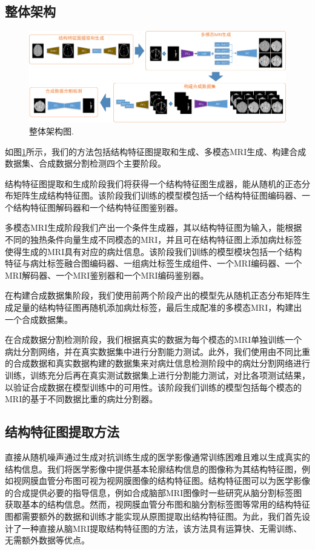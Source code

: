 \documentclass[letterpaper]{article} %
\begin{document}
\subsection{整体架构}
\begin{figure}
	\centering
	\includegraphics[width=0.98\linewidth]{figures/architecture}
	\caption{整体架构图.}
	\label{architecture}
\end{figure}
如图\ref{architecture}所示，我们的方法包括结构特征图提取和生成、多模态MRI生成、构建合成数据集、合成数据分割检测四个主要阶段。

结构特征图提取和生成阶段我们将获得一个结构特征图生成器，能从随机的正态分布矩阵生成结构特征图。该阶段我们训练的模型模包括一个结构特征图编码器、一个结构特征图解码器和一个结构特征图鉴别器。

多模态MRI生成阶段我们产出一个条件生成器，其以结构特征图为输入，能根据不同的独热条件向量生成不同模态的MRI，并且可在结构特征图上添加病灶标签使得生成的MRI具有对应的病灶信息。该阶段我们训练的模型模块包括一个结构特征与病灶标签融合图编码器、一组病灶标签生成组件、一个MRI编码器、一个MRI解码器、一个MRI鉴别器和一个MRI编码鉴别器。

在构建合成数据集阶段，我们使用前两个阶段产出的模型先从随机正态分布矩阵生成足量的结构特征图再随机添加病灶标签，最后生成配准的多模态MRI，构建出一个合成数据集。

在合成数据分割检测阶段，我们根据真实的数据为每个模态的MRI单独训练一个病灶分割网络，并在真实数据集中进行分割能力测试。此外，我们使用由不同比重的合成数据和真实数据构建的数据集来对病灶信息检测阶段中的病灶分割网络进行训练，训练充分后再在真实测试数据集上进行分割能力测试，对比各项测试结果，以验证合成数据在模型训练中的可用性。该阶段我们训练的模型包括每个模态的MRI的基于不同数据比重的病灶分割器。

\subsection{结构特征图提取方法}
直接从随机噪声通过生成对抗训练生成的医学影像通常训练困难且难以生成真实的结构信息。我们将医学影像中提供基本轮廓结构信息的图像称为其结构特征图，例如视网膜血管分布图可视为视网膜图像的结构特征图\cite{41costa2017towards}。结构特征图可以为医学影像的合成提供必要的指导信息，例如合成脑部MRI图像时一些研究从脑分割标签图获取基本的结构信息\cite{4shin2018medical}。然而，视网膜血管分布图和脑分割标签图等常用的结构特征图都需要额外的数据和训练才能实现从原图提取出结构特征图。为此，我们首先设计了一种直接从脑MRI提取结构特征图的方法，该方法具有运算快、无需训练、无需额外数据等优点。
\end{document}
